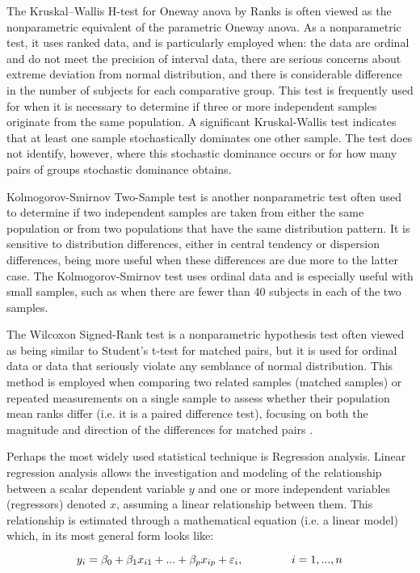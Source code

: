The Kruskal–Wallis H-test for Oneway \gls{anova} by Ranks is often viewed as the nonparametric equivalent of the parametric Oneway \gls{anova}. As a nonparametric test, it uses ranked data, and is particularly employed when: the data are ordinal and do not meet the precision of interval data, there are serious concerns about extreme deviation from normal distribution, and there is considerable difference in the number of subjects for each comparative group. This test is frequently used for when it is necessary to determine if three or more independent samples originate from the same population. A significant Kruskal-Wallis test indicates that at least one sample stochastically dominates one other sample. The test does not identify, however, where this stochastic dominance occurs or for how many pairs of groups stochastic dominance obtains.

Kolmogorov-Smirnov Two-Sample test is another nonparametric test often used to determine if two independent samples are taken from either the same population or from two populations that have the same distribution pattern. It is sensitive to distribution differences, either in central tendency or dispersion differences, being more useful when these differences are due more to the latter case. The Kolmogorov-Smirnov test uses ordinal data and is especially useful with small samples, such as when there are fewer than 40 subjects in each of the two samples.

The Wilcoxon Signed-Rank test is a nonparametric hypothesis test often viewed as being similar to Student's t-test for matched pairs, but it is used for ordinal data or data that seriously violate any semblance of normal distribution. This method is employed when comparing two related samples (matched samples) or repeated measurements on a single sample to assess whether their population mean ranks differ (i.e. it is a paired difference test), focusing on both the magnitude and direction of the differences for matched pairs \citep{macfarland2016introduction}.

Perhaps the most widely used statistical technique is Regression analysis. Linear regression analysis allows the investigation and modeling of the relationship between a scalar dependent variable $ y $ and one or more independent variables (regressors) denoted $ x $, assuming a linear relationship between them. This relationship is estimated through a mathematical equation (i.e. a linear model) which, in its most general form looks like:

\begin{equation}
	\centering
	\label{regression}
		y_{i} = \beta_{0} + \beta_{1}x_{i1} + ... + \beta_{p}x_{ip} + \varepsilon_{i},	\hspace{15mm}	i = 1,...,n
\end{equation}
 
